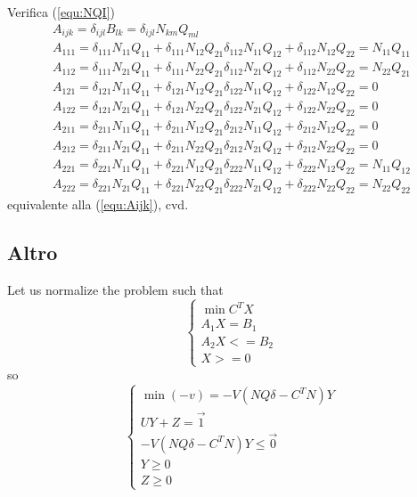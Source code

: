 \documentclass[a4paper,11pt]{article}
\begin{document}
Verifica (\ref{equ:NQI})
\[
\begin{array}{ll}
A_{ijk} = \delta_{ijl} B_{lk}
= \delta_{ijl} N_{km} Q_{ml} \\

A_{111} = \delta_{111} N_{11} Q_{11} + 
\delta_{111} N_{12} Q_{21}
\delta_{112} N_{11} Q_{12} + 
\delta_{112} N_{12} Q_{22} =
N_{11} Q_{11} \\
A_{112} = \delta_{111} N_{21} Q_{11} + 
\delta_{111} N_{22} Q_{21}
\delta_{112} N_{21} Q_{12} + 
\delta_{112} N_{22} Q_{22} =
N_{22} Q_{21} \\
A_{121} = \delta_{121} N_{11} Q_{11} + 
\delta_{121} N_{12} Q_{21}
\delta_{122} N_{11} Q_{12} + 
\delta_{122} N_{12} Q_{22} = 0 \\
A_{122} = \delta_{121} N_{21} Q_{11} + 
\delta_{121} N_{22} Q_{21}
\delta_{122} N_{21} Q_{12} + 
\delta_{122} N_{22} Q_{22} = 0 \\
A_{211} = \delta_{211} N_{11} Q_{11} + 
\delta_{211} N_{12} Q_{21}
\delta_{212} N_{11} Q_{12} + 
\delta_{212} N_{12} Q_{22} = 0 \\
A_{212} = \delta_{211} N_{21} Q_{11} + 
\delta_{211} N_{22} Q_{21}
\delta_{212} N_{21} Q_{12} + 
\delta_{212} N_{22} Q_{22} = 0 \\
A_{221} = \delta_{221} N_{11} Q_{11} + 
\delta_{221} N_{12} Q_{21}
\delta_{222} N_{11} Q_{12} + 
\delta_{222} N_{12} Q_{22} =
N_{11} Q_{12} \\
A_{222} = \delta_{221} N_{21} Q_{11} + 
\delta_{221} N_{22} Q_{21}
\delta_{222} N_{21} Q_{12} + 
\delta_{222} N_{22} Q_{22} =
N_{22} Q_{22}
\end{array}
\]
equivalente alla (\ref{equ:Aijk}), cvd.

\subsection{Altro}

Let us normalize the problem such that
\[
\left\{
\begin{array}{ll}
	\min C^T X \\
	A_1 X = B_1 \\
	A_2 X <= B_2 \\
	X >= 0
\end{array}
\right.
\]
so
\[
\left\{
\begin{array}{ll}
	\min (-v) = -V \left( N Q \delta - C^T N \right) Y \\
	U Y + Z = \vec{1} \\
	-V \left( N Q \delta - C^T N \right) Y \le \vec{0} \\
	Y \ge 0 \\
	Z \ge 0
\end{array}
\right.
\]
\end{document}
